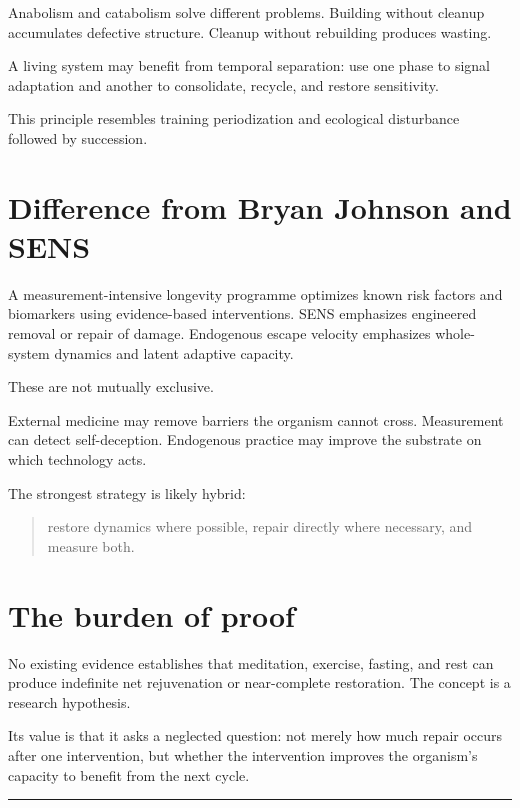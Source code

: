 Anabolism and catabolism solve different problems. Building without cleanup accumulates defective structure. Cleanup without rebuilding produces wasting.

A living system may benefit from temporal separation: use one phase to signal adaptation and another to consolidate, recycle, and restore sensitivity.

This principle resembles training periodization and ecological disturbance followed by succession.

\section{Difference from Bryan Johnson and SENS}

A measurement-intensive longevity programme optimizes known risk factors and biomarkers using evidence-based interventions. SENS emphasizes engineered removal or repair of damage. Endogenous escape velocity emphasizes whole-system dynamics and latent adaptive capacity.

These are not mutually exclusive.

External medicine may remove barriers the organism cannot cross. Measurement can detect self-deception. Endogenous practice may improve the substrate on which technology acts.

The strongest strategy is likely hybrid:

\begin{quote}
restore dynamics where possible, repair directly where necessary, and measure both.
\end{quote}

\section{The burden of proof}

No existing evidence establishes that meditation, exercise, fasting, and rest can produce indefinite net rejuvenation or near-complete restoration. The concept is a research hypothesis.

Its value is that it asks a neglected question: not merely how much repair occurs after one intervention, but whether the intervention improves the organism's capacity to benefit from the next cycle.

\begin{center}\rule{0.5\linewidth}{0.5pt}\end{center}
